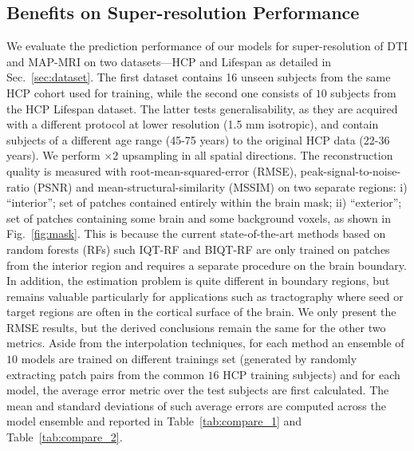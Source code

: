 \subsection{Benefits on Super-resolution Performance}
We evaluate the prediction performance of our models for super-resolution of DTI and MAP-MRI on two datasets---HCP and Lifespan as detailed in Sec.~\ref{sec:dataset}. The first dataset contains 16 unseen subjects from the same HCP cohort used for training, while the second one consists of $10$ subjects from the HCP Lifespan dataset. The latter tests generalisability, as they are acquired with a different protocol at lower resolution (1.5 mm isotropic), and contain subjects of a different age range (45-75 years) to the original HCP data (22-36 years). We perform $\times 2$ upsampling in all spatial directions. The reconstruction quality is measured with root-mean-squared-error (RMSE), peak-signal-to-noise-ratio (PSNR) and mean-structural-similarity (MSSIM) \cite{wang2004image} on two separate regions:  i) ``interior''; set of patches contained entirely within the brain mask; ii) ``exterior''; set of patches containing some brain and some background voxels, as shown in Fig.~\ref{fig:mask}. This is because the current state-of-the-art methods based on random forests (RFs) such IQT-RF \cite{alexander2017image} and BIQT-RF \cite{tanno2016bayesian} are only trained on patches from the interior region and requires a separate procedure on the brain boundary. In addition, the estimation problem is quite different in boundary regions, but remains valuable particularly for applications such as tractography where seed or target regions are often in the cortical surface of the brain. We only present the RMSE results, but the derived conclusions remain the same for the other two metrics. Aside from the interpolation techniques, for each method an ensemble of $10$ models are trained on different trainings set (generated by randomly extracting patch pairs from the common $16$ HCP training subjects) and for each model, the average error metric over the test subjects are first calculated. The mean and standard deviations of such average errors are computed across the model ensemble and reported in Table~\ref{tab:compare_1} and Table~\ref{tab:compare_2}. 

